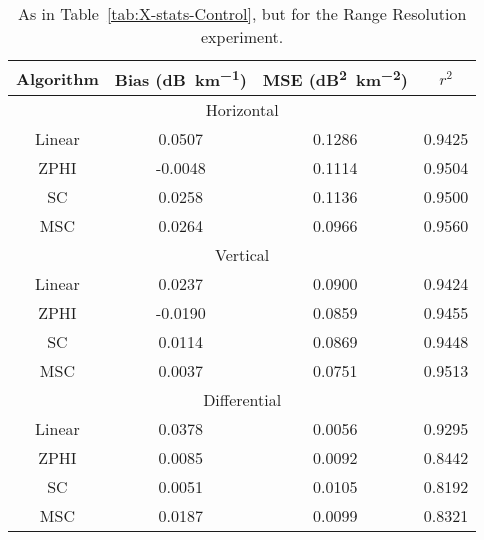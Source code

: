\begin{table}
    \centering
    \begin{tabular}{| c | c | c | c |}
        \hline
        Algorithm & Bias (\si{dB\per \kilo\meter}) & MSE (\si{dB\squared \per \kilo\meter \squared}) & $r^2$ \\
        \hline
        \hline
        \multicolumn{4}{|c|}{Horizontal}\\
        \hline
        Linear & 0.0507 & 0.1286 & 0.9425\\
        ZPHI & -0.0048 & 0.1114 & 0.9504\\
        SC & 0.0258 & 0.1136 & 0.9500\\
        MSC & 0.0264 & 0.0966 & 0.9560\\
        \hline
        \multicolumn{4}{|c|}{Vertical}\\
        \hline
        Linear & 0.0237 & 0.0900 & 0.9424\\
        ZPHI & -0.0190 & 0.0859 & 0.9455\\
        SC & 0.0114 & 0.0869 & 0.9448\\
        MSC & 0.0037 & 0.0751 & 0.9513\\
        \hline
        \multicolumn{4}{|c|}{Differential}\\
        \hline
        Linear & 0.0378 & 0.0056 & 0.9295\\
        ZPHI & 0.0085 & 0.0092 & 0.8442\\
        SC & 0.0051 & 0.0105 & 0.8192\\
        MSC & 0.0187 & 0.0099 & 0.8321\\
\hline
    \end{tabular}
    \caption{As in Table~\ref{tab:X-stats-Control}, but for
    the Range Resolution experiment.}
    \label{tab:X-stats-Range Resolution}
\end{table}
